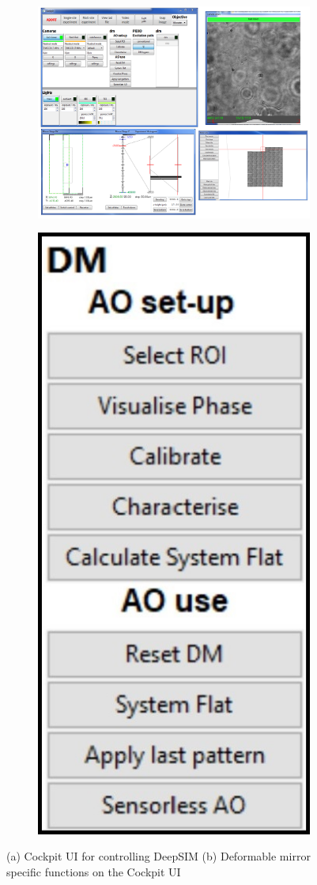 \begin{figure}[h]
	\centering
	\begin{subfigure}{0.45\textwidth}
		\centering
		\includegraphics[width=1\linewidth, scale=0.5]{images/DeepSIM_control_software.png}
		\caption{}
		\label{fig:DeepSIM_control_software}
	\end{subfigure}
	\begin{subfigure}{0.45\textwidth}
		\centering
		\includegraphics[width=0.35\linewidth, scale=0.5]{images/DM_methods_cockpit.jpg}
		\caption{}
		\label{fig:DM_methods_cockpit}
	\end{subfigure}
	\caption{(a) Cockpit UI for controlling DeepSIM (b) Deformable mirror specific functions on the Cockpit UI}
	\label{fig:Cockpit_UI}
\end{figure}

